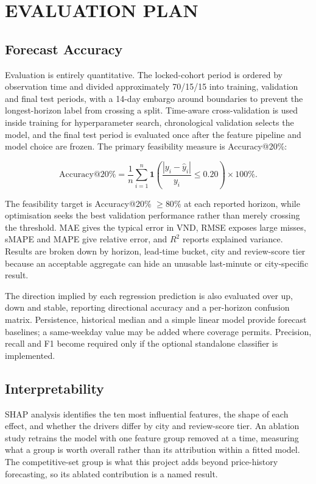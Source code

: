 \chapter{EVALUATION PLAN}

\section{Forecast Accuracy}

Evaluation is entirely quantitative. The locked-cohort period is ordered by observation time and divided approximately 70/15/15 into training, validation and final test periods, with a 14-day embargo around boundaries to prevent the longest-horizon label from crossing a split. Time-aware cross-validation is used inside training for hyperparameter search, chronological validation selects the model, and the final test period is evaluated once after the feature pipeline and model choice are frozen. The primary feasibility measure is Accuracy@20\%:

\[
\text{Accuracy@20\%} = \frac{1}{n} \sum_{i=1}^{n}
\mathbf{1}\!\left(\frac{|y_i-\hat{y}_i|}{y_i} \leq 0.20\right) \times 100\% .
\]

The feasibility target is Accuracy@20\% $\geq 80\%$ at each reported horizon, while optimisation seeks the best validation performance rather than merely crossing the threshold. MAE gives the typical error in VND, RMSE exposes large misses, sMAPE and MAPE give relative error, and $R^2$ reports explained variance. Results are broken down by horizon, lead-time bucket, city and review-score tier because an acceptable aggregate can hide an unusable last-minute or city-specific result.

The direction implied by each regression prediction is also evaluated over up, down and stable, reporting directional accuracy and a per-horizon confusion matrix. Persistence, historical median and a simple linear model provide forecast baselines; a same-weekday value may be added where coverage permits. Precision, recall and F1 become required only if the optional standalone classifier is implemented.

\section{Interpretability}

SHAP analysis \citep{lundberg2017} identifies the ten most influential features, the shape of each effect, and whether the drivers differ by city and review-score tier. An ablation study retrains the model with one feature group removed at a time, measuring what a group is worth overall rather than its attribution within a fitted model. The competitive-set group is what this project adds beyond price-history forecasting, so its ablated contribution is a named result.

